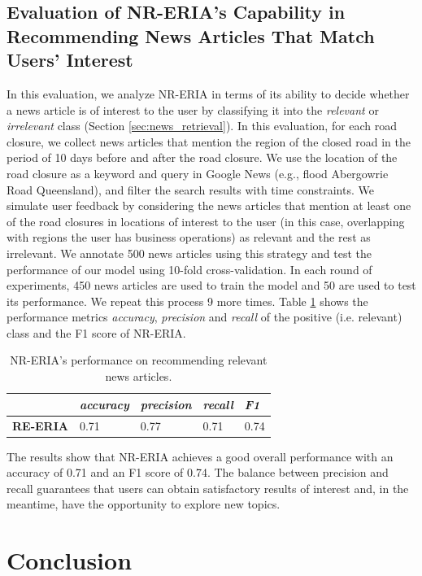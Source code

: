 \documentclass[]{ceurart}
\begin{document}
\subsection{Evaluation of NR-ERIA's Capability in Recommending News Articles That Match Users' Interest}
In this evaluation, we analyze NR-ERIA in terms of its ability to decide whether a news article is of interest to the user by classifying it into the \textit{relevant} or \textit{irrelevant} class (Section \ref{sec:news_retrieval}). In this evaluation, for each road closure, we collect news articles that mention the region of the closed road in the period of 10 days before and after the road closure. We use the location of the road closure as a keyword and query in Google News (e.g., flood Abergowrie Road Queensland), and filter the search results with time constraints. We simulate user feedback by considering the news articles that mention at least one of the road closures in locations of interest to the user (in this case, overlapping with regions the user has business operations) as relevant and the rest as irrelevant. We annotate 500 news articles using this strategy and test the performance of our model using 10-fold cross-validation. In each round of experiments, 450 news articles are used to train the model and 50 are used to test its performance. We repeat this process 9 more times. Table \ref{tab:RL-ERIA e3} shows the performance metrics \textit{accuracy}, \textit{precision} and \textit{recall} of the positive (i.e. relevant) class and the F1 score of NR-ERIA.


\begin{table}[h]
\caption{NR-ERIA's performance on recommending relevant news articles.}
\label{tab:RL-ERIA e3}
  \centering
  \begin{tabular}{p{2cm}p{1.5cm}p{1.5cm}p{1.5cm}p{1.5cm}}
    \toprule
     & \textit{accuracy} & \textit{precision} & \textit{recall} &\textit{ F1}\\
    \midrule
    \textbf{RE-ERIA} & 0.71 & 0.77 & 0.71 & 0.74\\
    \bottomrule
  \end{tabular}
\end{table}

The results show that NR-ERIA achieves a good overall performance with an accuracy of 0.71 and an F1 score of 0.74. The balance between precision and recall guarantees that users can obtain satisfactory results of interest and, in the meantime, have the opportunity to explore new topics.

\section{Conclusion}\label{5}
\end{document}
